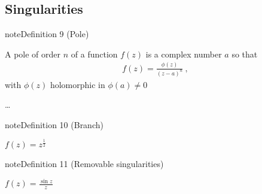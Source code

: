 \documentclass[letterpaper,10pt,english]{jupyterBook}
\begin{document}
\subsection{Singularities}
\label{\detokenize{ch/complex/analysis:singularities}}\label{\detokenize{ch/complex/analysis:complex-analysis-singularities}}\label{ch/complex/analysis:definition-2}
\begin{sphinxadmonition}{note}{Definition 9 (Pole)}



\sphinxAtStartPar
A pole of order \(n\) of a function \(f(z)\) is a complex number \(a\) so that
\begin{equation*}
\begin{split}f(z) = \frac{\phi(z)}{(z-a)^n} \ ,\end{split}
\end{equation*}
\sphinxAtStartPar
with \(\phi(z)\) holomorphic in \(\phi(a) \ne 0\)
\end{sphinxadmonition}

\sphinxAtStartPar
{} …
\label{ch/complex/analysis:definition-3}
\begin{sphinxadmonition}{note}{Definition 10 (Branch)}


\end{sphinxadmonition}

\sphinxAtStartPar
{} \(f(z) = z^{\frac{1}{2}}\)
\label{ch/complex/analysis:definition-4}
\begin{sphinxadmonition}{note}{Definition 11 (Removable singularities)}


\end{sphinxadmonition}

\sphinxAtStartPar
{} \(f(z) = \frac{\sin z}{z}\)

\sphinxAtStartPar
{}
\end{document}
